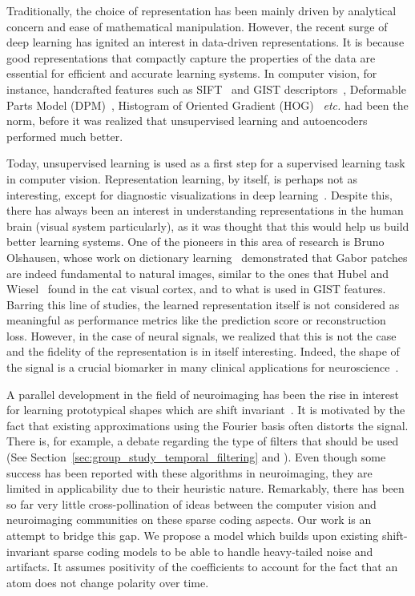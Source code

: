 Traditionally, the choice of representation has been mainly driven by analytical concern and ease of mathematical manipulation. However, the recent surge of deep learning has ignited an interest in data-driven representations. It is because good representations  that compactly capture the properties of the data are essential for efficient and accurate learning systems. In computer vision, for instance, handcrafted features such as SIFT~\citep{lowe1999object} and GIST descriptors~\citep{oliva2001modeling}, Deformable Parts Model (DPM)~\citep{felzenszwalb2010object}, Histogram of Oriented Gradient (HOG)~\citep{dalal2005histograms} \emph{etc.} had been the norm, before it was realized that unsupervised learning and autoencoders performed much better.

Today, unsupervised learning is used as a first step for a supervised learning task in computer vision. Representation learning, by itself, is perhaps not as interesting, except for diagnostic visualizations in deep learning~\citep{zeiler2014visualizing}. Despite this, there has always been an interest in understanding representations in the human brain (visual system particularly), as it was thought that this would help us build better learning systems. One of the pioneers in this area of research is Bruno Olshausen, whose work on dictionary learning~\citep{olshausen1996emergence} demonstrated that Gabor patches are indeed fundamental to natural images, similar to the ones that Hubel and Wiesel~\citep{hubel1962receptive, marcelja1980mathematical} found in the cat visual cortex, and to what is used in GIST features. Barring this line of studies, the learned representation itself is not considered as meaningful as performance metrics like the prediction score or reconstruction loss. However, in the case of neural signals, we realized that this is not the case and the fidelity of the representation is in itself interesting. Indeed, the shape of the signal is a crucial biomarker in many clinical applications for neuroscience~\citep{cole2017brain}. 

A parallel development in the field of neuroimaging has been the rise in interest for learning prototypical shapes which are shift invariant~\citep{jost2006motif, barthelemy2013multivariate, brockmeier2016learning, hitziger2017adaptive}. It is motivated by the fact that existing approximations using the Fourier basis often distorts the signal. There is, for example, a debate regarding the type of filters that should be used (See Section~\ref{sec:group_study_temporal_filtering} and \cite{widmann2015digital,parks1987digital,ifeachor2002digital, gotz-etal:15}). 
Even though some success has been reported
with these algorithms in neuroimaging, they are limited in applicability due to their heuristic nature.
Remarkably, there has been so far very little cross-pollination of ideas between the computer vision and neuroimaging communities on these sparse coding aspects. 
Our work is an attempt to bridge this gap. 
We propose a model which builds upon existing shift-invariant sparse coding models to be able to handle heavy-tailed noise and artifacts. It assumes positivity of the coefficients to account for the fact that an atom does not change polarity over time. 

